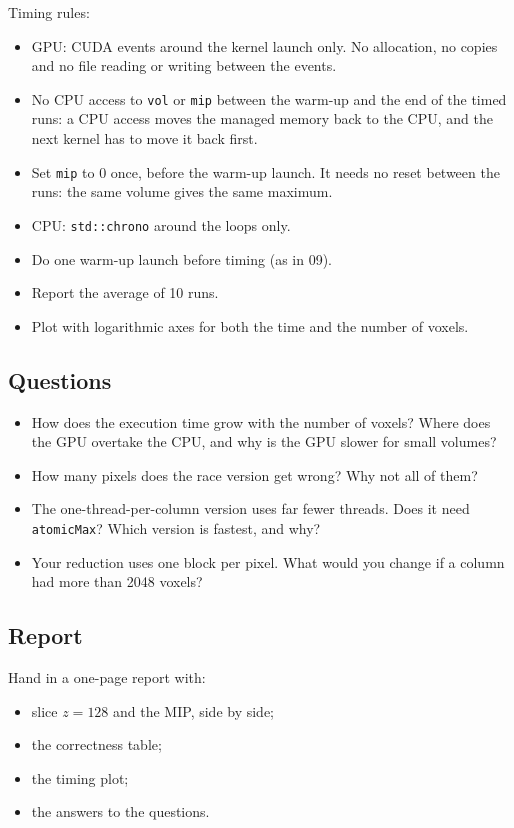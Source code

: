 \documentclass[main.tex]{subfiles}
\begin{document}
Timing rules:
\begin{itemize}[nosep]
  \item GPU: CUDA events around the kernel launch only. No allocation, no copies and no file reading or writing between the events.
  \item No CPU access to \texttt{vol} or \texttt{mip} between the warm-up and the end of the timed runs: a CPU access moves the managed memory back to the CPU, and the next kernel has to move it back first.
  \item Set \texttt{mip} to 0 once, before the warm-up launch. It needs no reset between the runs: the same volume gives the same maximum.
  \item CPU: \texttt{std::chrono} around the loops only.
  \item Do one warm-up launch before timing (as in 09).
  \item Report the average of 10 runs.
  \item Plot with logarithmic axes for both the time and the number of voxels.
\end{itemize}

\subsection{Questions}
\begin{itemize}[nosep]
  \item How does the execution time grow with the number of voxels? Where does the GPU overtake the CPU, and why is the GPU slower for small volumes?
  \item How many pixels does the race version get wrong? Why not all of them?
  \item The one-thread-per-column version uses far fewer threads. Does it need \texttt{atomicMax}? Which version is fastest, and why?
  \item Your reduction uses one block per pixel. What would you change if a column had more than 2048 voxels?
\end{itemize}

\subsection{Report}
Hand in a one-page report with:
\begin{itemize}[nosep]
  \item slice $z = 128$ and the MIP, side by side;
  \item the correctness table;
  \item the timing plot;
  \item the answers to the questions.
\end{itemize}
\end{document}
